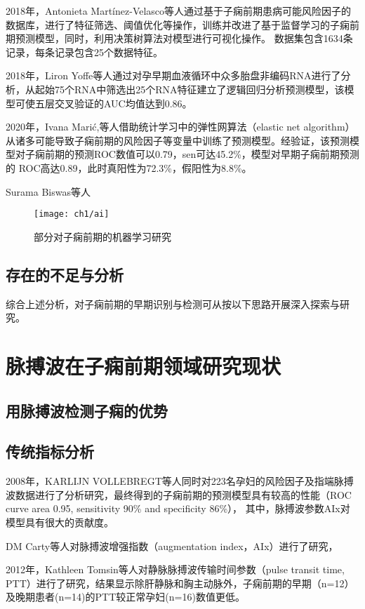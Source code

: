 2018年，Antonieta Martínez-Velasco等人\cite{Martinez2018}通过基于子痫前期患病可能风险因子的数据库，进行了特征筛选、阈值优化等操作，训练并改进了基于监督学习的子痫前期预测模型，同时，利用决策树算法对模型进行可视化操作。
数据集包含1634条记录，每条记录包含25个数据特征。

2018年，Liron Yoffe等人\cite{Yoffe2018}通过对孕早期血液循环中众多胎盘非编码RNA进行了分析，从起始75个RNA中筛选出25个RNA特征建立了逻辑回归分析预测模型，该模型可使五层交叉验证的AUC均值达到0.86。

2020年，Ivana Mari{\'{c}}\cite{Maric2020},等人借助统计学习中的弹性网算法（elastic net algorithm）从诸多可能导致子痫前期的风险因子等变量中训练了预测模型。经验证，该预测模型对子痫前期的预测ROC数值可以0.79，sen可达45.2\%，模型对早期子痫前期预测的
ROC高达0.89，此时真阳性为72.3\%，假阳性为8.8\%。

Surama Biswas等人

\begin{figure}[htbp]
    \centering
    \texttt{[image: ch1/ai]}
    \caption{\label{fig:ai}部分对子痫前期的机器学习研究}
\end{figure}

\subsection{存在的不足与分析}
综合上述分析，对子痫前期的早期识别与检测可从按以下思路开展深入探索与研究。


\section{脉搏波在子痫前期领域研究现状}
\subsection{用脉搏波检测子痫的优势}

\subsection{传统指标分析}

2008年，KARLIJN VOLLEBREGT等人\cite{KARLIJN2008}同时对223名孕妇的风险因子及指端脉搏波数据进行了分析研究，最终得到的子痫前期的预测模型具有较高的性能（ROC curve area 0.95, sensitivity 90\% and specificity 86\%），
其中，脉搏波参数AIx对模型具有很大的贡献度。

DM Carty等人对脉搏波增强指数（augmentation index，AIx）进行了研究，

2012年，Kathleen Tomsin等人\cite{Tomsin2012}对静脉脉搏波传输时间参数（pulse transit time, PTT）进行了研究，结果显示除肝静脉和胸主动脉外，子痫前期的早期（n=12）及晚期患者(n=14)的PTT较正常孕妇(n=16)数值更低。

